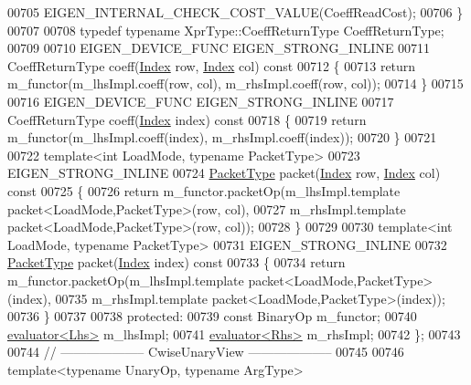 \begin{DoxyCode}
00705     EIGEN\_INTERNAL\_CHECK\_COST\_VALUE(CoeffReadCost);
00706   \}
00707 
00708   \textcolor{keyword}{typedef} \textcolor{keyword}{typename} XprType::CoeffReturnType CoeffReturnType;
00709 
00710   EIGEN\_DEVICE\_FUNC EIGEN\_STRONG\_INLINE
00711   CoeffReturnType coeff(\hyperlink{namespace_eigen_a62e77e0933482dafde8fe197d9a2cfde}{Index} row, \hyperlink{namespace_eigen_a62e77e0933482dafde8fe197d9a2cfde}{Index} col)\textcolor{keyword}{ const}
00712 \textcolor{keyword}{  }\{
00713     \textcolor{keywordflow}{return} m\_functor(m\_lhsImpl.coeff(row, col), m\_rhsImpl.coeff(row, col));
00714   \}
00715 
00716   EIGEN\_DEVICE\_FUNC EIGEN\_STRONG\_INLINE
00717   CoeffReturnType coeff(\hyperlink{namespace_eigen_a62e77e0933482dafde8fe197d9a2cfde}{Index} index)\textcolor{keyword}{ const}
00718 \textcolor{keyword}{  }\{
00719     \textcolor{keywordflow}{return} m\_functor(m\_lhsImpl.coeff(index), m\_rhsImpl.coeff(index));
00720   \}
00721 
00722   \textcolor{keyword}{template}<\textcolor{keywordtype}{int} LoadMode, \textcolor{keyword}{typename} PacketType>
00723   EIGEN\_STRONG\_INLINE
00724   \hyperlink{struct_eigen_1_1_packet_type}{PacketType} packet(\hyperlink{namespace_eigen_a62e77e0933482dafde8fe197d9a2cfde}{Index} row, \hyperlink{namespace_eigen_a62e77e0933482dafde8fe197d9a2cfde}{Index} col)\textcolor{keyword}{ const}
00725 \textcolor{keyword}{  }\{
00726     \textcolor{keywordflow}{return} m\_functor.packetOp(m\_lhsImpl.template packet<LoadMode,PacketType>(row, col),
00727                               m\_rhsImpl.template packet<LoadMode,PacketType>(row, col));
00728   \}
00729 
00730   \textcolor{keyword}{template}<\textcolor{keywordtype}{int} LoadMode, \textcolor{keyword}{typename} PacketType>
00731   EIGEN\_STRONG\_INLINE
00732   \hyperlink{struct_eigen_1_1_packet_type}{PacketType} packet(\hyperlink{namespace_eigen_a62e77e0933482dafde8fe197d9a2cfde}{Index} index)\textcolor{keyword}{ const}
00733 \textcolor{keyword}{  }\{
00734     \textcolor{keywordflow}{return} m\_functor.packetOp(m\_lhsImpl.template packet<LoadMode,PacketType>(index),
00735                               m\_rhsImpl.template packet<LoadMode,PacketType>(index));
00736   \}
00737 
00738 \textcolor{keyword}{protected}:
00739   \textcolor{keyword}{const} BinaryOp m\_functor;
00740   \hyperlink{struct_eigen_1_1internal_1_1evaluator}{evaluator<Lhs>} m\_lhsImpl;
00741   \hyperlink{struct_eigen_1_1internal_1_1evaluator}{evaluator<Rhs>} m\_rhsImpl;
00742 \};
00743 
00744 \textcolor{comment}{// -------------------- CwiseUnaryView --------------------}
00745 
00746 \textcolor{keyword}{template}<\textcolor{keyword}{typename} UnaryOp, \textcolor{keyword}{typename} ArgType>

\end{DoxyCode}
